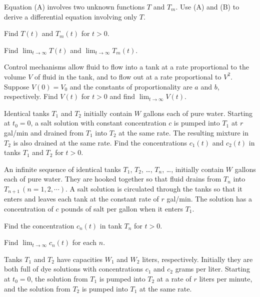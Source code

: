 \begin{exerciselist}
\begin{alist}
\item %
Equation (A) involves  two unknown functions $T$ and $T_m$.
 Use (A) and (B) to derive a
differential equation involving only $T$.
\item %
Find $T(t)$ and $T_m(t)$ for $t>0$.
\item %
Find $\lim_{t\to\infty}T(t)$ and
 $\lim_{t\to\infty}T_m(t)$.
\end{alist}




\item\label{exer:4.2.18}Control mechanisms allow fluid to flow into a tank
at a rate proportional to the volume $V$ of fluid in the tank, and to
flow
out at a rate proportional to $V^2$. Suppose $V(0)=V_0$ and the
constants of proportionality are $a$ and $b$, respectively.
Find $V(t)$  for $t>0$ and find $\lim_{t\to\infty}V(t)$.


\item\label{exer:4.2.19}Identical tanks $T_1$ and $T_2$ initially contain $W$ gallons each of
pure water. Starting at $t_0=0$, a salt solution with constant
concentration $c$ is pumped into $T_1$ at $r$ gal/min and drained from
$T_1$ into $T_2$ at the same rate. The resulting mixture in $T_2$ is
also drained at the same rate. Find the concentrations $c_1(t)$
and $c_2(t)$ in tanks $T_1$ and $T_2$ for $t>0$.


\item\label{exer:4.2.20}An infinite sequence of identical tanks $T_1$, $T_2$, \dots, $T_n$, \dots,
initially contain $W$ gallons
each of pure water.  They are hooked together so that fluid drains
from $T_n$ into  $T_{n+1}\,(n=1,2,\cdots)$.
A salt solution is circulated through the tanks so that it enters and
leaves each tank at the constant rate of $r$ gal/min.
The solution has a concentration of
$c$  pounds of salt per
gallon when it enters $T_1$.

\begin{alist}
\item %
Find the concentration $c_n(t)$
in tank $T_n$ for $t>0$.
\item %
  Find $\lim_{t\to\infty}c_n(t)$ for each $n$.
\end{alist}



\item\label{exer:4.2.21}Tanks $T_1$  and $T_2$ have capacities $W_1$ and $W_2$ liters,
respectively.
Initially they are both full of dye solutions with concentrations $c_{1}$
and $c_2$ grams per liter. Starting at $t_0=0$,  the solution from $T_1$
is pumped into $T_2$ at a rate of $r$  liters per minute,
and the solution from $T_2$
is pumped into $T_1$ at the same rate.


\end{exerciselist}
